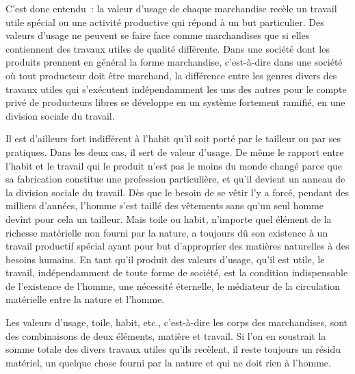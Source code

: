 \documentclass[french,twoside]{book} %
\begin{document}
C’est donc entendu : la valeur d’usage de chaque marchandise recèle un travail utile spécial ou une activité productive qui répond à un but particulier. Des valeurs d’usage ne peuvent se faire face comme marchandises que si elles contiennent des travaux utiles de qualité différente. Dans une société dont les produits prennent en général la forme marchandise, c’est-à-dire dans une société où tout producteur doit être marchand, la différence entre les genres divers des travaux utiles qui s’exécutent indépendamment les uns des autres pour le compte privé de producteurs libres se développe en un système fortement ramifié, en une division sociale du travail.\par
Il est d’ailleurs fort indifférent à l’habit qu’il soit porté par le tailleur ou par ses pratiques. Dans les deux cas, il sert de valeur d’usage. De même le rapport entre l’habit et le travail qui le produit n’est pas le moins du monde changé parce que sa fabrication constitue une profession particulière, et qu’il devient un anneau de la division sociale du travail. Dès que le besoin de se vêtir l’y a forcé, pendant des milliers d’années, l’homme s’est taillé des vêtements sans qu’un seul homme devînt pour cela un tailleur. Mais toile ou habit, n’importe quel élément de la richesse matérielle non fourni par la nature, a toujours dû son existence à un travail productif spécial ayant pour but d’approprier des matières naturelles à des besoins humains. En tant qu’il produit des valeurs d’usage, qu’il est utile, le travail, indépendamment de toute forme de société, est la condition indispensable de l’existence de l’homme, une nécessité éternelle, le médiateur de la circulation matérielle entre la nature et l’homme.\par
Les valeurs d’usage, toile, habit, etc., c’est-à-dire les corps des marchandises, sont des combinaisons de deux éléments, matière et travail. Si l’on en soustrait la somme totale des divers travaux utiles qu’ils recèlent, il reste toujours un résidu matériel, un quelque chose fourni par la nature et qui ne doit rien à l’homme.\par
\end{document}
